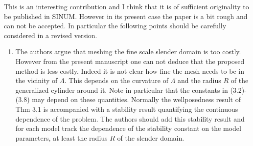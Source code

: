 \documentclass{article}
\begin{document}
This is an interesting contribution and I think that it is of
sufficient originality to be published in SINUM. However in its
present case the paper is a bit rough and can not be accepted. In particular the following
points should be carefully considered in a revised version.

\begin{enumerate}
\item The authors argue that meshing the fine scale slender domain is
  too costly. However from the present manuscript one can not deduce
  that the proposed method is less costly. Indeed it is not clear how
  fine the mesh needs to be in the vicinity of $\Lambda$. This depends
  on the curvature of $\Lambda$ and the radius $R$ of the generalized
  cylinder around it.
Note in particular that the constants in (3.2)-(3.8) may depend on
these quantities. Normally the wellposedness result of Thm 3.1 is
accompanied with a stability result quantifying the continuous
dependence of the problem. The authors should add this stability
result and for each model track the dependence of the stability
constant on the model parameters, at least the radius $R$ of the
slender domain.


\end{enumerate}
\end{document}
